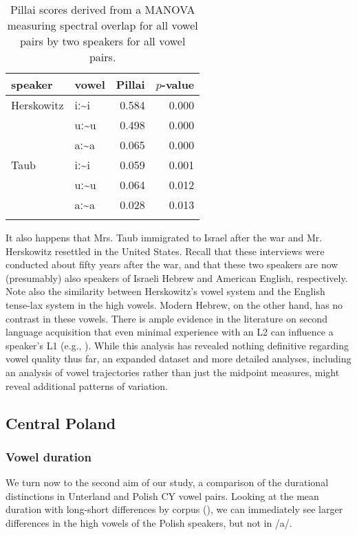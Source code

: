 \documentclass[output=paper,colorlinks,citecolor=brown]{langscibook}
\begin{document}
\begin{table}
\begin{tabularx}{.8\textwidth}{XXrr}
\lsptoprule
{ speaker} & { vowel} & { Pillai} & { $p$-value}\\
\midrule
Herskowitz & iː{\textasciitilde}i & 0.584 & 0.000\\
& uː{\textasciitilde}u & 0.498 & 0.000\\
& aː{\textasciitilde}a & 0.065 & 0.000\\
\midrule
Taub & iː{\textasciitilde}i & 0.059 & 0.001\\
& uː{\textasciitilde}u & 0.064 & 0.012\\
& aː{\textasciitilde}a & 0.028 & 0.013\\
\lspbottomrule
\end{tabularx}
\caption{\label{tab:nove:6} Pillai scores derived from a MANOVA measuring spectral overlap for all vowel pairs by two speakers for all vowel pairs.}
\end{table}

It also happens that Mrs. Taub immigrated to Israel after the war and Mr. Herskowitz resettled in the United States. Recall that these interviews were conducted about fifty years after the war, and that these two speakers are now (presumably) also speakers of Israeli Hebrew and American English, respectively. Note also the similarity between Herskowitz's vowel system and the English tense-lax system in the high vowels. Modern Hebrew, on the other hand, has no contrast in these vowels. There is ample evidence in the literature on second language acquisition that even minimal experience with an L2 can influence a speaker's L1 (e.g., \citealt{Chang2011}). While this analysis has revealed nothing definitive regarding vowel quality thus far, an expanded dataset and more detailed analyses, including an analysis of vowel trajectories rather than just the midpoint measures, might reveal additional patterns of variation.

\subsection{Central Poland}
\label{sec:nove:5.2}
\subsubsection{Vowel duration}
\label{sec:nove:5.2.1}
We turn now to the second aim of our study, a comparison of the durational distinctions in Unterland and Polish CY vowel pairs. Looking at the mean duration with long-short differences by corpus (), we can immediately see larger differences in the high vowels of the Polish speakers, but not in \mbox{/a/}.
\end{document}

